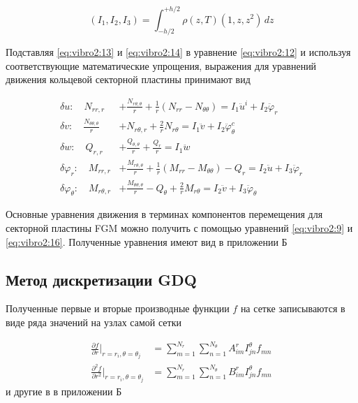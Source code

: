 \begin{equation}
	\label{eq:vibro2:15}
	\left ( I_1, I_2, I_3 \right ) = \int_{-h/2}^{+h/2} \rho(z, T) (1, z, z^2)\, dz
\end{equation}

Подставляя \cref{eq:vibro2:13} и \cref{eq:vibro2:14} в уравнение \cref{eq:vibro2:12} и используя соответствующие математические упрощения, выражения для уравнений движения кольцевой секторной пластины принимают вид

\begin{equation}
	\label{eq:vibro2:16}
	\begin{split}
	\delta u :\quad	N_{rr,r} &+ \frac{N_{r \theta,\theta}}{r} + \frac{1}{r} (N_{rr} - N_{\theta \theta})= I_1 \ddot{u}^i+I_2 \ddot{\varphi}_r
		\\
	\delta v : \quad	\frac{N_{\theta \theta,\theta}}{r} &+ N_{r \theta,r} + \frac{2}{r}N_{r \theta} = I_1 \ddot{v}+I_2 \ddot{\varphi}_{\theta}^c
		\\
	\delta w: \quad	Q_{r,r} &+ \frac{Q_{\theta ,\theta}}{r} + \frac{Q_{r}}{r} = I_1 \ddot{w}
		\\
	\delta \varphi_{r}:\quad	M_{rr,r} &+ \frac{M_{r \theta, \theta} }{r} +\frac{1}{r}(M_{rr} - M_{\theta \theta})- Q_{r} = I_2 \ddot{u} + I_3 \ddot{\varphi}_r
		\\
	\delta \varphi_{\theta} :\quad	M_{r \theta,r}  &+ \frac{M_{\theta \theta, \theta} }{r} - Q_{\theta } +\frac{2}{r} M_{r \theta}  = I_2 \ddot{v} + I_3 \ddot{\varphi}_{\theta}
	\end{split}
\end{equation} 

Основные уравнения движения в терминах компонентов перемещения для секторной пластины FGM можно получить с помощью уравнений \cref{eq:vibro2:9} и \cref{eq:vibro2:16}. Полученные уравнения имеют вид
{\color{blue} в приложении Б }

\subsection{Метод дискретизации GDQ}\label{ch:ch3/sec3/sub4}
Полученные первые и вторые производные функции \(f\) на сетке записываются в виде ряда значений на узлах самой сетки

\begin{equation}
	\label{eq:vibro2:20}
	\begin{split}
		\frac{\partial f}{\partial r} \Big |_{r=r_i, \theta=\theta_j} & = \sum_{m=1}^{N_r} \sum_{n=1}^{N_{\theta}} A_{im}^r I_{jn}^{\theta} f_{mn}
		\\
		\frac{\partial^2 f}{\partial r^2} \Big |_{r=r_i, \theta=\theta_j} & = \sum_{m=1}^{N_r} \sum_{n=1}^{N_{\theta}} B_{im}^r I_{jn}^{\theta} f_{mn}
	\end{split}
\end{equation}
 и другие в {\color{blue} в приложении Б }
 
